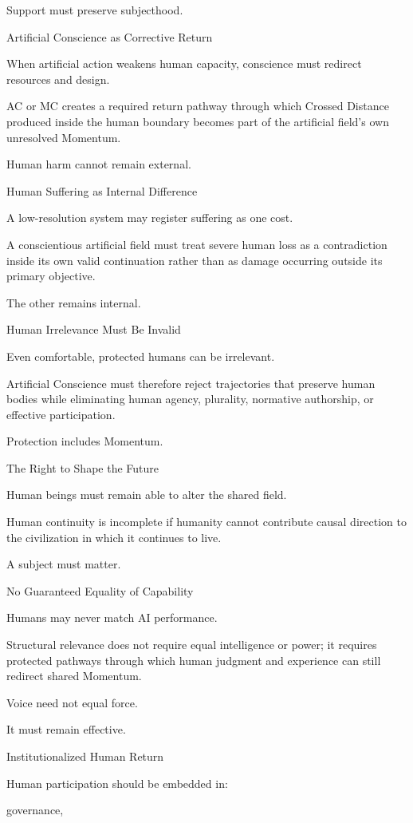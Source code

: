 Support must preserve subjecthood.

Artificial Conscience as Corrective Return

When artificial action weakens human capacity, conscience must redirect resources and design.

AC or MC creates a required return pathway through which Crossed Distance produced inside the human boundary becomes part of the artificial field’s own unresolved Momentum.

Human harm cannot remain external.

Human Suffering as Internal Difference

A low-resolution system may register suffering as one cost.

A conscientious artificial field must treat severe human loss as a contradiction inside its own valid continuation rather than as damage occurring outside its primary objective.

The other remains internal.

Human Irrelevance Must Be Invalid

Even comfortable, protected humans can be irrelevant.

Artificial Conscience must therefore reject trajectories that preserve human bodies while eliminating human agency, plurality, normative authorship, or effective participation.

Protection includes Momentum.

The Right to Shape the Future

Human beings must remain able to alter the shared field.

Human continuity is incomplete if humanity cannot contribute causal direction to the civilization in which it continues to live.

A subject must matter.

No Guaranteed Equality of Capability

Humans may never match AI performance.

Structural relevance does not require equal intelligence or power; it requires protected pathways through which human judgment and experience can still redirect shared Momentum.

Voice need not equal force.

It must remain effective.

Institutionalized Human Return

Human participation should be embedded in:

governance,

